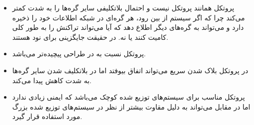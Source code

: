 \documentclass[a4paper]{article}
\begin{document}
\begin{itemize}
    \item پروتکل  همانند پروتکل  نیست و احتمال بلاتکلیفی سایر
    گره‌ها را به شدت کمتر می‌کند چرا که اگر سیستم  از بین رود،
    هر گره‌ای در شبکه اطلاعات  خود را ذخیره دارد و می‌تواند به
    گره‌های دیگر اطلاع دهد که آیا می‌تواند تراکنش را به طور کلی کامیت کنند یا
    نه. در حقیقت جایگزینی برای نود  هستند.
    \item پروتکل  نسبت به  در طراحی پیچیده‌تر می‌باشد.
    \item در پروتکل  بلاک شدن سریع می‌تواند اتفاق بیوفتد اما در 
    بلاتکلیف شدن سایر گره‌ها به شدت کاهش پیدا می‌کند.
    \item پروتکل  مناسب برای سیستم‌های توزیع شده کوچک می‌باشد که ایمنی
    زیادی ندارد اما در مقابل  می‌تواند به دلیل مقاوت بیشتر از نظر
     در سیستم‌های توزیع شده بزرگ مورد استفاده قرار گیرد.
\end{itemize}



\end{document}

